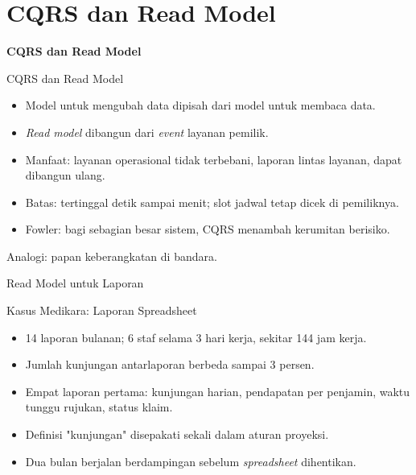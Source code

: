\documentclass[aspectratio=169, table, 12pt]{beamer}
\begin{document}
\section{CQRS dan Read Model}

\begin{frame}{\hfill}
  \centering
  \Huge{\textbf{CQRS dan Read Model}}
\end{frame}

\begin{frame}{{\Large CQRS dan Read Model}}
  \vspace{6pt}
  \small
  \begin{itemize}
    \item Model untuk mengubah data dipisah dari model untuk membaca data.
    \item \textit{Read model} dibangun dari \textit{event} layanan pemilik.
    \item Manfaat: layanan operasional tidak terbebani, laporan lintas layanan,
          dapat dibangun ulang.
    \item Batas: tertinggal detik sampai menit; slot jadwal tetap dicek di
          pemiliknya.
    \item Fowler: bagi sebagian besar sistem, CQRS menambah kerumitan berisiko.
  \end{itemize}
  \vspace{4pt}
  {\small Analogi: papan keberangkatan di bandara.}
\end{frame}

\begin{frame}{{\Large Read Model untuk Laporan}}
  \centering
\end{frame}

\begin{frame}{{\Large Kasus Medikara: Laporan Spreadsheet}}
  \vspace{6pt}
  \small
  \begin{itemize}
    \item 14 laporan bulanan; 6 staf selama 3 hari kerja, sekitar 144 jam kerja.
    \item Jumlah kunjungan antarlaporan berbeda sampai 3 persen.
    \item Empat laporan pertama: kunjungan harian, pendapatan per penjamin,
          waktu tunggu rujukan, status klaim.
    \item Definisi "kunjungan" disepakati sekali dalam aturan proyeksi.
    \item Dua bulan berjalan berdampingan sebelum \textit{spreadsheet}
          dihentikan.
  \end{itemize}
\end{frame}
\end{document}
